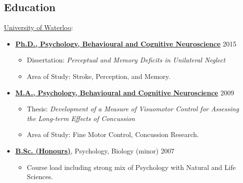 \documentclass[10pt]{article}
\providecommand{\tightlist}{%
  \setlength{\itemsep}{0pt}\setlength{\parskip}{0pt}}
\begin{document}
\pagebreak[3]

\subsection{Education}\label{education}

\href{http://www.uwaterloo.ca/}{University of Waterloo}:

\begin{itemize}
\item
  \href{http://psychology.uwaterloo.ca}{\textbf{Ph.D., Psychology,
  Behavioural and Cognitive Neuroscience}} \hfill 2015

  \begin{itemize}
  \tightlist
  \item
    Dissertation: \emph{Perceptual and Memory Deficits in Unilateral
    Neglect}
  \item
    Area of Study: Stroke, Perception, and Memory.
  \end{itemize}
\end{itemize}

\pagebreak[2]

\begin{itemize}
\item
  \href{http://psychology.uwaterloo.ca}{\textbf{M.A., Psychology,
  Behavioural and Cognitive Neuroscience}} \hfill 2009

  \begin{itemize}
  \tightlist
  \item
    Thesis: \emph{Development of a Measure of Visuomotor Control for
    Assessing the Long-term Effects of Concussion}
  \item
    Area of Study: Fine Motor Control, Concussion Research.
  \end{itemize}
\end{itemize}

\pagebreak[2]

\begin{itemize}
\item
  \href{http://science.uwaterloo.ca}{\textbf{B.Sc. (Honours)}},
  Psychology, Biology (minor) \hfill 2007

  \begin{itemize}
  \tightlist
  \item
    Course load including strong mix of Psychology with Natural and Life
    Sciences.
  \end{itemize}
\end{itemize}

\pagebreak[3]
\end{document}
